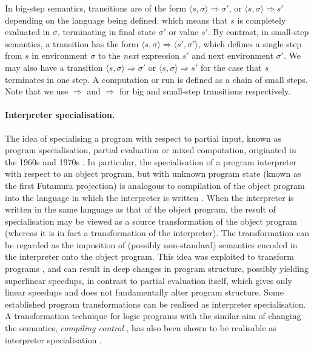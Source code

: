 \documentclass{llncs}
\begin{document}
In big-step semantics, transitions are of the form $\langle s, \sigma\rangle \Longrightarrow \sigma'$, or 
$\langle s, \sigma\rangle \Longrightarrow s'$ depending on the language being defined.
which means that $s$ is completely evaluated in $\sigma$, terminating in final state $\sigma'$ or value $s'$.
%
By contrast, in small-step semantics, a transition has the form $\langle s, \sigma\rangle \Rightarrow \langle s',\sigma'\rangle$, 
which defines a single step
from $s$ in environment $\sigma$ to the \emph{next} expression $s'$ and next environment $\sigma'$. We may also have a transition
$\langle s, \sigma\rangle \Rightarrow \sigma'$ or $\langle s, \sigma\rangle \Rightarrow s'$ for the case that $s$ terminates in one step.
A computation or run is defined as a 
chain of small steps.  Note that we use $\Longrightarrow$ and $\Rightarrow$ for big and small-step transitions respectively.

\paragraph{Interpreter specialisation.}
The idea of specialising a program with respect to partial input,  known as program specialisation, partial evaluation or mixed computation, 
originated in the 1960s and 1970s \cite{Lombardi67,Futamura,BeckmanHOS76,Ershov77}.  
In particular, the specialisation of a program interpreter with respect to an object program,  but with unknown
program state (known as the first Futamura projection) is analogous to compilation of the object 
program into the language in which the interpreter is written \cite{Futamura}.  
When the interpreter is written in the same language as that of the object program,
the result of specialisation may be viewed as a source transformation of the object program 
(whereas it is in fact a transformation of the interpreter). 
The transformation can be regarded as the imposition of (possibly non-standard) semantics encoded in the
interpreter onto the object program. 
This idea was exploited to transform programs \cite{Gallagher-86,Turchin85,GluckJ94,Jones04,GiacobazziJM12}, and can result in deep changes in program structure, 
possibly yielding superlinear speedups, in contrast to partial evaluation itself, which gives only linear speedups and does not fundamentally alter program
structure.  Some established program transformations
can be realised as interpreter specialisation.  A transformation technique for logic programs with the similar 
aim of changing the semantics, \emph{compiling control} \cite{Bruynooghe-DeSchreye-Krekels},
has also been shown to be realisable as interpreter specialisation \cite{NysS18}.
\end{document}
